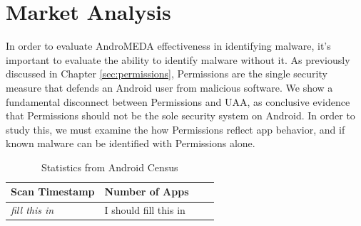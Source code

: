 \chapter{Market Analysis}
\label{sec:market}

In order to evaluate AndroMEDA effectiveness in identifying malware, it's important to evaluate the ability to identify malware without it. As previously discussed in Chapter \ref{sec:permissions}, Permissions are the single security measure that defends an Android user from malicious software. We show a fundamental disconnect between Permissions and UAA, as conclusive evidence that Permissions should not be the sole security system on Android. In order to study this, we must examine the how Permissions reflect app behavior, and if known malware can be identified with Permissions alone.


\begin{table}[t]
\begin{small}
\begin{tabular}{l|lll}
Scan Timestamp & Number of Apps &  \\
\hline

\textit{fill this in} & I should fill this in  \\

\end{tabular}
\end{small}
\caption{Statistics from Android Census}
\label{tab:marketstats}
\end{table}


